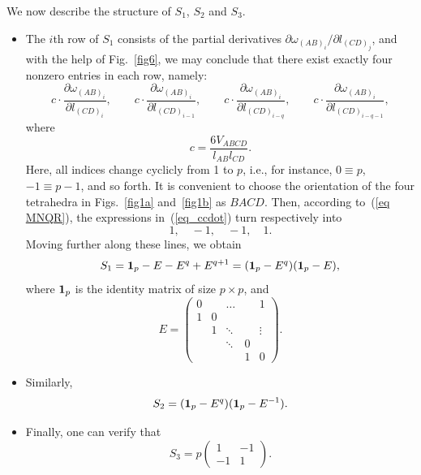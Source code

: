 \documentclass[pdftex]{sigma}
\begin{document}
We now describe the structure of $S_1$, $S_2$ and $S_3$.
\begin{itemize}
\itemsep=0pt
  \item[(i)] The $i$th row of $S_1$ consists of the partial derivatives $\partial \omega_{(AB)_i} / \partial l_{(CD)_j}$, and
with the help of Fig.~\ref{fig6}, we may conclude that there exist exactly four nonzero entries in each row, namely:
\begin{equation}
c\cdot \frac{\partial \omega_{(AB)_i}}{\partial l_{(CD)_i}}, \qquad c\cdot \frac{\partial \omega_{(AB)_i}}{\partial l_{(CD)_{i-1}}}, \qquad c\cdot \frac{\partial
\omega_{(AB)_i}}{\partial l_{(CD)_{i-q}}}, \qquad c\cdot \frac{\partial \omega_{(AB)_i}}{\partial l_{(CD)_{i-q-1}}},
\label{eq_ccdot}
\end{equation}
where
\begin{displaymath}
c=\frac{6V_{ABCD}}{l_{AB}l_{CD}}.
\end{displaymath}
Here, all indices change cyclicly from 1 to $p$, i.e., for instance, $0 \equiv p$, $-1 \equiv p-1$, and so forth. It is convenient to choose the orientation of the four tetrahedra in Figs.~\ref{fig1a} and~\ref{fig1b} as $BACD$. Then, according to~(\ref{eq MNQR}), the expressions in~(\ref{eq_ccdot}) turn respectively into
\begin{displaymath}
1,\quad -1,\quad -1,\quad 1.
\end{displaymath}
Moving further along these lines, we obtain
\begin{equation}
S_1 = {\bf 1}_p - E - E^q + E^{q+1} = ({\bf 1}_p - E^q) ({\bf 1}_p - E),
\label{eq_S1}
\end{equation}
where ${\bf 1}_p$ is the identity matrix of size $p \times p$, and
\begin{equation}
E =\left(\begin{array}{ccccc}0 &  & \ldots &  & 1 \\1 & 0 &  &  &  \\ & 1 & \ddots &  & \vdots \\ &  & \ddots & 0 &  \\ &  &  & 1 & 0\end{array}\right).
\label{eq_E}
\end{equation}
  \item[(ii)] Similarly,
\begin{equation}
S_2 = ({\bf 1}_p - E^q) ({\bf 1}_p - E^{- 1}). \label{eq_S2}
\end{equation}
  \item[(iii)] Finally, one can verify that
\begin{equation*}
S_3 = p \left(
\begin{array}{cc}
1 & - 1 \\
- 1 & 1
\end{array} \right).
\end{equation*}
\end{itemize}
\end{document}
